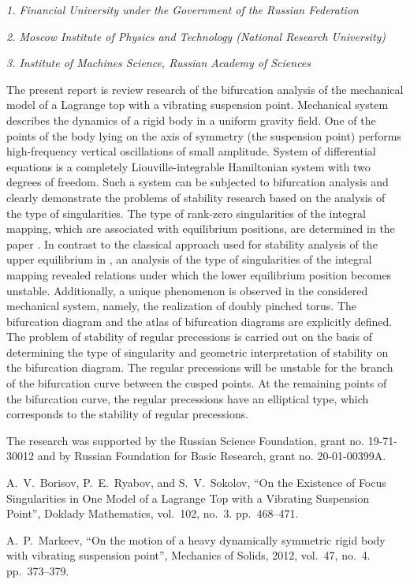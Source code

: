 
	
\begin{center}
	\maketitle
	{\large\textit{1. Financial University under the Government of the Russian Federation}}
	
	{\large\textit{2. Moscow Institute of Physics and Technology (National Research University)}}
	
	{\large\textit{3. Institute of Machines Science, Russian Academy of Sciences}}
\end{center}


The present report is review research of the bifurcation analysis of the mechanical model of a Lagrange top with a vibrating suspension point.
Mechanical system  describes the dynamics of a rigid body in a uniform gravity field. One of the points of the body lying on the axis of symmetry (the suspension point) performs high-frequency vertical oscillations of small amplitude.  System of differential equations is a completely Liouville-integrable Hamiltonian system with two degrees of freedom. Such a system can be subjected to bifurcation analysis and clearly demonstrate the problems of stability research based on the analysis of the type of singularities. The type of rank-zero singularities of the integral mapping, which are associated with equilibrium positions, are determined in the paper \cite{BorRyabSok2020}. In contrast to the classical approach used for stability analysis of the upper equilibrium in \cite{Markeev2012}, an analysis of the type of singularities of the integral mapping revealed relations under which the lower equilibrium position becomes unstable. Additionally, a unique phenomenon is observed in the considered mechanical system, namely, the realization of doubly pinched torus. The bifurcation diagram and the atlas of bifurcation diagrams are explicitly defined. The problem of stability of regular precessions is carried out on the basis of determining the type of singularity and geometric interpretation of stability on the bifurcation diagram. The regular precessions will be unstable for the branch of the bifurcation curve between the cusped points. At the remaining points of the bifurcation curve, the regular precessions have an elliptical type, which corresponds to the stability of regular precessions.

The research was supported by the Russian Science Foundation, grant no. 19-71-30012 and by Russian Foundation for Basic Research, grant no. 20-01-00399A.


\begin{thebibliography}{99}
	 A.~V.~Borisov,  P.~E.~Ryabov, and S.~V.~Sokolov,
``On the Existence of Focus Singularities in One Model of a Lagrange Top with a Vibrating Suspension Point'', Doklady Mathematics, vol.~102, no.~3. pp.~468--471.

 A.~P.~Markeev, ``On the motion of a heavy dynamically symmetric rigid body with vibrating suspension point'', Mechanics of Solids, 2012, vol.~47, no.~4. pp.~373--379.
\end{thebibliography}


